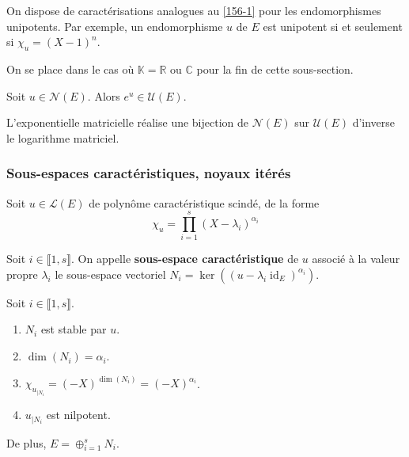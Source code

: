   \begin{remark}
    On dispose de caractérisations analogues au \cref{156-1} pour les endomorphismes unipotents. Par exemple, un endomorphisme $u$ de $E$ est unipotent si et seulement si $\chi_u = (X-1)^n$.
  \end{remark}

  On se place dans le cas où $\mathbb{K} = \mathbb{R}$ ou $\mathbb{C}$ pour la fin de cette sous-section.


  \begin{proposition}
    Soit $u \in \mathcal{N}(E)$. Alors $e^u \in \mathcal{U}(E)$.
  \end{proposition}

  \begin{theorem}
    L'exponentielle matricielle réalise une bijection de $\mathcal{N}(E)$ sur $\mathcal{U}(E)$ d'inverse le logarithme matriciel.
  \end{theorem}

  \subsubsection{Sous-espaces caractéristiques, noyaux itérés}


  Soit $u \in \mathcal{L}(E)$ de polynôme caractéristique scindé, de la forme
  \[ \chi_u = \prod_{i=1}^{s} (X-\lambda_i)^{\alpha_i} \]

  \begin{definition}
    Soit $i \in \llbracket 1, s \rrbracket$. On appelle \textbf{sous-espace caractéristique} de $u$ associé à la valeur propre $\lambda_i$ le sous-espace vectoriel $N_i = \ker((u-\lambda_i \operatorname{id}_E)^{\alpha_i})$.
  \end{definition}

  \begin{proposition}
    Soit $i \in \llbracket 1, s \rrbracket$.
    \begin{enumerate}[label={\bfseries(\roman*)}]
      \item $N_i$ est stable par $u$.
      \item $\dim(N_i) = \alpha_i$.
      \item $\chi_{u_{|N_i}} = (-X)^{\dim(N_i)} = (-X)^{\alpha_i}$.
      \item $u_{|N_i}$ est nilpotent.
    \end{enumerate}
    De plus, $E = \oplus_{i=1}^s N_i$.
  \end{proposition}


